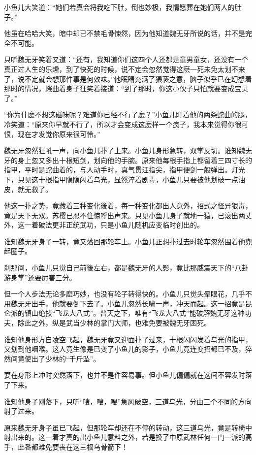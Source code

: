 \documentclass[12pt,oneside]{book}
\begin{document}
小鱼儿大笑道：``她们若真会将我吃下肚，倒也妙极，我情愿葬在她们两人的肚子。''

他虽在哈哈大笑，暗中却已不禁毛骨悚然，因为他知道魏无牙所说的话，并不是完全不可能。

只听魏无牙笑着又道：``还有，我知道你们这四个人还都是童男童女，还没有一个真正过人生的乐趣，到了快死的时候，说不定会忽然觉得这麽一死未免太划不来了，说不定就会想那件事是何效味。''他眠睛充满了猥亵之意，脑子似乎已在幻想着那时的情况，蜷曲着身子狂笑着接道：``到了那时，你这小伙子只怕就要变成宝贝了。''

``你为什麽不想这磁味呢？难道你已经不行了麽？''小鱼儿盯着他的两条蛇曲的腿，冷笑道：``原来你早就不行了，所以才会变成这麽样一个疯子，我本来觉得你很可恨，现在才发觉你原来很可怜。''

魏无牙忽然狂吼一声，向小鱼儿扑了上来。小鱼儿身形急转，双掌反切。谁知魏无牙的身上忽又多出十根短剑，划向他的手腕。原来他每根手指上都留着三四寸长的指甲，平时是蛇曲着的，与人动手时，真气贯汪指尖，指甲便剑一般弹出。灯光下，只见这十根指甲隐隐闪着乌光，显然淬着剧毒，小鱼儿只要被他划破一点油皮，就无救了。

他这一扑之势，竟藏着三种变化後着，每一种变化都出人意外，招式之怪异狠毒，竟是天下无双。苏樱已忍不住惊呼出声来。只见小鱼儿身子就地一猿，已滚出两丈外，这一着破法更非正统武功，只是小鱼儿随机应变临时创出的。

谁知魏无牙身子一转，竟又落回那轮车上。小鱼儿正想扑过去时轮车忽然围着他兜起圈子。

刹那间，小鱼儿只觉自己前後左右，都是魏无牙的人影，竟比那威震天下的``八卦游身掌''还要厉害三分。

但一个人步法无论多麽巧妙，也没有轮子转得快的。小鱼儿只觉头晕眼花，几乎不用魏无牙出手，他就要倒下去了。小鱼儿忽然长啸一声，冲天而起。这一招竟是昆仑派的镇山绝技``飞龙大八式''。普天之下，唯有``飞龙大八式''能破解魏无牙这种功夫，除此之外，纵是武当少林的掌门大师，也难免要被魏无牙困死。

谁知他身形方自凌空飞起，魏无牙竟又迎面扑了过来，十根闪闪发着乌光的指甲，又划到他咽喉。这人竟生像是已变了小鱼儿的影子，小鱼儿竟连变招都已不及，猝然间竟使出了少林的``千斤坠''。

要在身形上冲时突然落下，也并不是件容易事。但小鱼儿偏偏就在这间不容发时落了下来。

谁知他身子刚落下，只听``嗖，嗖，嗖''急风破空，三道乌光，分由三个不同的方向射了过来。

原来魏无牙身子虽已飞起，但那轮车却还在不停的转动，这三道乌光，竟是转椅中射出来的。这一着才真的出小鱼儿意料之外，若是换了中原武林任何一门一派的高手，此番都难免要丧在这三根乌骨箭下！
\end{document}
